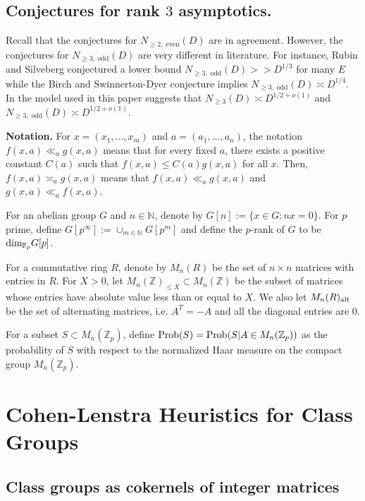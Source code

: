 \documentclass[12pt,reqno]{amsart}
\numberwithin{equation}{section}
\def\Z{{\mathbb Z}}
\def\F{{\mathbb F}}
\def\N{{\mathbb N}}
\begin{document}
\subsection{Conjectures for rank $3$ asymptotics.}

Recall that the conjectures for $N_{\ge 2, \; \text{even}}(D)$ are in agreement. However, the conjectures for $N_{\ge 3, \; \text{odd}}(D)$ are very different in literature. For instance, Rubin and Silveberg conjectured a lower bound $N_{\ge 3, \; \text{odd}}(D) >> D^{1/3}$ for many $E$ while the Birch and Swinnerton-Dyer conjecture implies $N_{\ge 3, \; \text{odd}}(D) \asymp D^{1/4}$. In the model used in this paper suggests that $N_{\ge 3}(D) \asymp D^{1/2+o(1)}$ and $N_{\ge 3, \; \text{odd}}(D) \asymp D^{1/2 + o(1)}$.

\vspace{2mm}

{\bf Notation.} For $x=(x_1, ..., x_m)$ and $a=(a_1, ..., a_n)$, the notation $f(x,a) \ll_a g(x,a)$ means that for every fixed $a$, there exists a positive constant $C(a)$ such that $f(x,a) \le C(a) g(x,a)$ for all $x$. Then, $f(x,a) \asymp_a g(x,a)$ means that $f(x,a) \ll_a g(x,a)$ and $g(x,a) \ll_a f(x,a)$.

For an abelian group $G$ and $n \in \N$, denote by $G[n]:= \{x \in G : nx = 0 \}$. For $p$ prime, define $G[p^\infty]:= \cup_{m \in \N} G[p^m]$ and define the $p$-rank of $G$ to be ${\rm dim_{\F_p}} G[p]$.

For a commutative ring $R$, denote by $M_n(R)$ be the set of $n \times n$ matrices with entries in $R$. For $X >0$, let $M_n(\Z)_{\le X} \subset M_n(\Z)$ be the subset of matrices whose entries have absolute value less than or equal to $X$. We also let $M_n(R)_{\rm alt}$ be the set of alternating matrices, i.e. $A^T = -A$ and all the diagonal entries are $0$.

For a subset $S \subset M_n(\Z_p)$, define ${\rm Prob}(S) = {\rm Prob}(S | A \in M_n(\Z_p))$ as the probability of $S$ with respect to the normalized Haar measure on the compact group $M_n(\Z_p)$.

\section{Cohen-Lenstra Heuristics for Class Groups}

\subsection{Class groups as cokernels of integer matrices}\label{modelCl}
\end{document}
